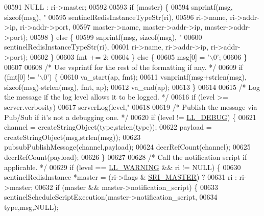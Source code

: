 \begin{DoxyCode}
{{{{{{00591                                          NULL : ri->master;
00592 
00593         \textcolor{keywordflow}{if} (master) \{
00594             snprintf(msg, \textcolor{keyword}{sizeof}(msg), \textcolor{stringliteral}{"%
00595                 sentinelRedisInstanceTypeStr(ri),
00596                 ri->name, ri->addr->ip, ri->addr->port,
00597                 master->name, master->addr->ip, master->addr->port);
00598         \} \textcolor{keywordflow}{else} \{
00599             snprintf(msg, \textcolor{keyword}{sizeof}(msg), \textcolor{stringliteral}{"%
00600                 sentinelRedisInstanceTypeStr(ri),
00601                 ri->name, ri->addr->ip, ri->addr->port);
00602         \}
00603         fmt += 2;
00604     \} \textcolor{keywordflow}{else} \{
00605         msg[0] = \textcolor{stringliteral}{'\(\backslash\)0'};
00606     \}
00607 
00608     \textcolor{comment}{/* Use vsprintf for the rest of the formatting if any. */}
00609     \textcolor{keywordflow}{if} (fmt[0] != \textcolor{stringliteral}{'\(\backslash\)0'}) \{
00610         va\_start(ap, fmt);
00611         vsnprintf(msg+strlen(msg), \textcolor{keyword}{sizeof}(msg)-strlen(msg), fmt, ap);
00612         va\_end(ap);
00613     \}
00614 
00615     \textcolor{comment}{/* Log the message if the log level allows it to be logged. */}
00616     \textcolor{keywordflow}{if} (level >= server.verbosity)
00617         serverLog(level,\textcolor{stringliteral}{"%
00618 
00619     \textcolor{comment}{/* Publish the message via Pub/Sub if it's not a debugging one. */}
00620     \textcolor{keywordflow}{if} (level != \hyperlink{server_8h_abcaffe365dee628fcf9fc90c69d534a1}{LL\_DEBUG}) \{
00621         channel = createStringObject(type,strlen(type));
00622         payload = createStringObject(msg,strlen(msg));
00623         pubsubPublishMessage(channel,payload);
00624         decrRefCount(channel);
00625         decrRefCount(payload);
00626     \}
00627 
00628     \textcolor{comment}{/* Call the notification script if applicable. */}
00629     \textcolor{keywordflow}{if} (level == \hyperlink{server_8h_a31229b9334bba7d6be2a72970967a14b}{LL\_WARNING} && ri != NULL) \{
00630         sentinelRedisInstance *master = (ri->flags & \hyperlink{sentinel_8c_a2ee83e5ff67b45746cd6a310f15334b2}{SRI\_MASTER}) ?
00631                                          ri : ri->master;
00632         \textcolor{keywordflow}{if} (master && master->notification\_script) \{
00633             sentinelScheduleScriptExecution(master->notification\_script,
00634                 type,msg,NULL);
}}}}}}}}}
\end{DoxyCode}
